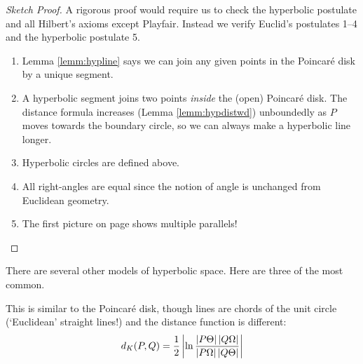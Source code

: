 \begin{proof}[Sketch Proof]
	A rigorous proof would require us to check the hyperbolic postulate and all Hilbert's axioms except Playfair. Instead we verify Euclid's postulates 1--4 and the hyperbolic postulate 5.
	\begin{enumerate}\itemsep0pt
	  \item Lemma \ref{lemm:hypline} says we can join any given points in the Poincaré disk by a unique segment.
	  \item A hyperbolic segment joins two points \emph{inside} the (open) Poincaré disk. The distance formula increases (Lemma \ref{lemm:hypdistwd}) unboundedly as $P$ moves towards the boundary circle, so we can always make a hyperbolic line longer.
	  \item Hyperbolic circles are defined above.
	  \item All right-angles are equal since the notion of angle is unchanged from Euclidean geometry.
	  \item The first picture on page \pageref{sec:hyp-models} shows multiple parallels!\hfill{\qedhere}
	\end{enumerate}
\end{proof}

\goodbreak




There are several other models of hyperbolic space. Here are three of the most common.

 This is similar to the Poincaré disk, though lines are chords of the unit circle (`Euclidean' straight lines!) and the distance function is different:
\[
	d_K(P,Q) =\frac 12\left| \ln\frac{\left| P\Theta\right|\left| Q\Omega\right|}{\left| P\Omega\right|\left| Q\Theta\right|}\right|
\]

